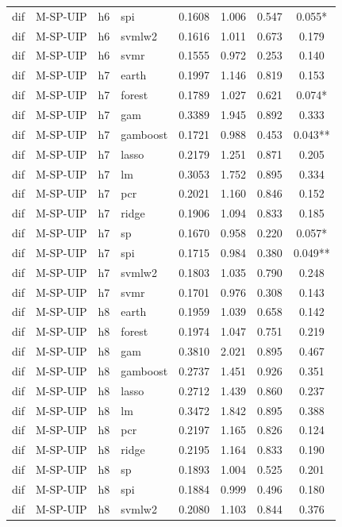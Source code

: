 \begin{ThreePartTable}
\begin{longtable}[t]{llclcccc}
dif & M-SP-UIP & h6 & spi & 0.1608 & 1.006 & 0.547 & 0.055*\\
dif & M-SP-UIP & h6 & svmlw2 & 0.1616 & 1.011 & 0.673 & 0.179\\
dif & M-SP-UIP & h6 & svmr & 0.1555 & 0.972 & 0.253 & 0.140\\
\addlinespace
dif & M-SP-UIP & h7 & earth & 0.1997 & 1.146 & 0.819 & 0.153\\
dif & M-SP-UIP & h7 & forest & 0.1789 & 1.027 & 0.621 & 0.074*\\
dif & M-SP-UIP & h7 & gam & 0.3389 & 1.945 & 0.892 & 0.333\\
dif & M-SP-UIP & h7 & gamboost & 0.1721 & 0.988 & 0.453 & 0.043**\\
dif & M-SP-UIP & h7 & lasso & 0.2179 & 1.251 & 0.871 & 0.205\\
dif & M-SP-UIP & h7 & lm & 0.3053 & 1.752 & 0.895 & 0.334\\
dif & M-SP-UIP & h7 & pcr & 0.2021 & 1.160 & 0.846 & 0.152\\
dif & M-SP-UIP & h7 & ridge & 0.1906 & 1.094 & 0.833 & 0.185\\
dif & M-SP-UIP & h7 & sp & 0.1670 & 0.958 & 0.220 & 0.057*\\
dif & M-SP-UIP & h7 & spi & 0.1715 & 0.984 & 0.380 & 0.049**\\
dif & M-SP-UIP & h7 & svmlw2 & 0.1803 & 1.035 & 0.790 & 0.248\\
dif & M-SP-UIP & h7 & svmr & 0.1701 & 0.976 & 0.308 & 0.143\\
\addlinespace
dif & M-SP-UIP & h8 & earth & 0.1959 & 1.039 & 0.658 & 0.142\\
dif & M-SP-UIP & h8 & forest & 0.1974 & 1.047 & 0.751 & 0.219\\
dif & M-SP-UIP & h8 & gam & 0.3810 & 2.021 & 0.895 & 0.467\\
dif & M-SP-UIP & h8 & gamboost & 0.2737 & 1.451 & 0.926 & 0.351\\
dif & M-SP-UIP & h8 & lasso & 0.2712 & 1.439 & 0.860 & 0.237\\
dif & M-SP-UIP & h8 & lm & 0.3472 & 1.842 & 0.895 & 0.388\\
dif & M-SP-UIP & h8 & pcr & 0.2197 & 1.165 & 0.826 & 0.124\\
dif & M-SP-UIP & h8 & ridge & 0.2195 & 1.164 & 0.833 & 0.190\\
dif & M-SP-UIP & h8 & sp & 0.1893 & 1.004 & 0.525 & 0.201\\
dif & M-SP-UIP & h8 & spi & 0.1884 & 0.999 & 0.496 & 0.180\\
dif & M-SP-UIP & h8 & svmlw2 & 0.2080 & 1.103 & 0.844 & 0.376\\

\end{longtable}
\end{ThreePartTable}
